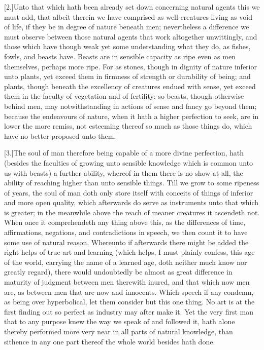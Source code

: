 [2.]Unto that which hath been already set down concerning natural agents this we must add, that albeit therein we have comprised as well creatures living as void of life, if they be in degree of nature beneath men; nevertheless a difference we must observe between those natural agents that work altogether unwittingly, and those which have though weak yet some understanding what they do, as fishes, fowls, and beasts have. Beasts are in sensible capacity as ripe even as men themselves, perhaps more ripe. For as stones, though in dignity of nature inferior unto plants, yet exceed them in firmness of strength or durability of being; and plants, though beneath the excellency of creatures endued with sense, yet exceed them in the faculty of vegetation and of fertility: so beasts, though otherwise behind men, may notwithstanding in actions of sense and fancy go beyond them; because the endeavours of nature, when it hath a higher perfection to seek, are in lower the more remiss, not esteeming thereof so much as those things do, which have no better proposed unto them.

[3.]The soul of man therefore being capable of a more divine perfection, hath (besides the faculties of growing unto sensible knowledge which is common unto us with beasts) a further ability, whereof in them there is no show at all, the ability of reaching higher than unto sensible things. Till  we grow to some ripeness of years, the soul of man doth only store itself with conceits of things of inferior and more open quality, which afterwards do serve as instruments unto that which is greater; in the meanwhile above the reach of meaner creatures it ascendeth not. When once it comprehendeth any thing above this, as the differences of time, affirmations, negations, and contradictions in speech, we then count it to have some use of natural reason. Whereunto if afterwards there might be added the right helps of true art and learning (which helps, I must plainly confess, this age of the world, carrying the name of a learned age, doth neither much know nor greatly regard), there would undoubtedly be almost as great difference in maturity of judgment between men therewith inured, and that which now men are, as between men that are now and innocents. Which speech if any condemn, as being over hyperbolical, let them consider but this one thing. No art is at the first finding out so perfect as industry may after make it. Yet the very first man that to any purpose knew the way we speak of and followed it, hath alone thereby performed more very near in all parts of natural knowledge, than sithence in any one part thereof the whole world besides hath done.

